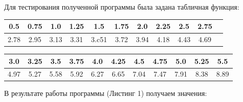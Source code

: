 \documentclass [12pt]{article}
\begin{document}
Для тестирования полученной программы была задана табличная функция:

\begin{table}[h]
\begin{center}
\begin{tabular}{|c|c|c|c|c|c|c|c|c|c|c|}
\hline
0.5 & 0.75 & 1.0 & 1.25 & 1.5 & 1.75 & 2.0 & 2.25 & 2.5 & 2.75\\
\hline
2.78 & 2.95 & 3.13 & 3.31 & 3.c51 & 3.72 & 3.94 & 4.18 & 4.43 & 4.69\\
\hline
\end{tabular}
\end{center}
\end{table}

\begin{table}[h]
\begin{center}
\begin{tabular}{|c|c|c|c|c|c|c|c|c|c|c|}
\hline
3.0 & 3.25 & 3.5 & 3.75 & 4.0 & 4.25 & 4.5 & 4.75 & 5.0 & 5.25 & 5.5 \\
\hline
4.97 & 5.27 & 5.58 & 5.92 & 6.27 & 6.65 & 7.04 & 7.47 & 7.91 & 8.38 & 8.89 \\
\hline
\end{tabular}
\end{center}
\end{table}

В результате работы программы (Листинг 1) получаем значения:
\end{document}
